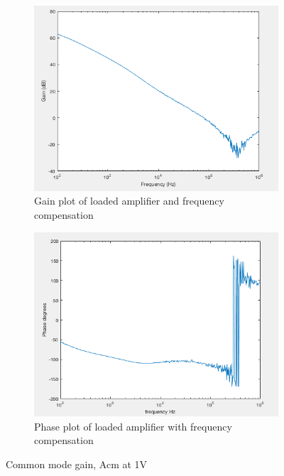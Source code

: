 		
			\begin{figure}[H]
			\centering
			\begin{subfigure}[b]{0.45\textwidth}
				\centering
		\includegraphics[scale=.40]{ExperimentalImplementation/gainwithcomp.png}
\caption{Gain plot of loaded amplifier and frequency compensation}
\label{fig:gainwithcomp}
			\end{subfigure}
			\hfill
			\begin{subfigure}[b]{0.45\textwidth}
		\includegraphics[scale=.40]{ExperimentalImplementation/phasewithcomp.png}
\caption{Phase plot of loaded amplifier with frequency compensation}
\label{fig:phasewithcomp}
			\end{subfigure}
			\caption{Common mode gain, Acm at 1V}
			\label{fig:compgain}
		\end{figure} 
	
